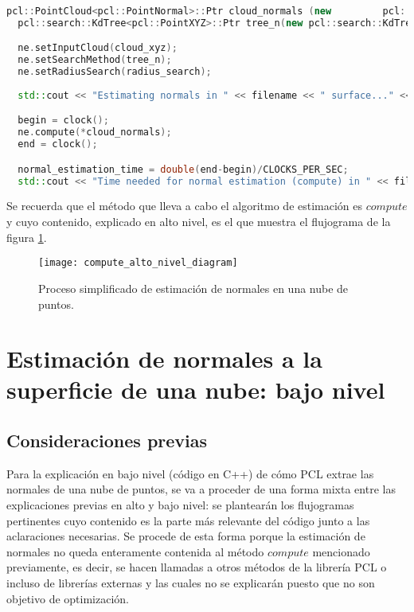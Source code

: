 \begin{lstlisting}[language=C++,breaklines]
  pcl::PointCloud<pcl::PointNormal>::Ptr cloud_normals (new 		pcl::PointCloud<pcl::PointNormal>);
  pcl::search::KdTree<pcl::PointXYZ>::Ptr tree_n(new pcl::search::KdTree<pcl::PointXYZ>());

  ne.setInputCloud(cloud_xyz);
  ne.setSearchMethod(tree_n);
  ne.setRadiusSearch(radius_search);
 
  std::cout << "Estimating normals in " << filename << " surface..." <<std::endl;

  begin = clock();
  ne.compute(*cloud_normals);
  end = clock();

  normal_estimation_time = double(end-begin)/CLOCKS_PER_SEC;
  std::cout << "Time needed for normal estimation (compute) in " << filename << ": " << normal_estimation_time << " seconds" << std::endl << std::endl;
\end{lstlisting}

Se recuerda que el método que lleva a cabo el algoritmo de estimación es $compute$ y cuyo contenido, explicado en alto nivel, es el que muestra el flujograma de la figura \ref{fig:compute_alto_nivel_diagram}.

\begin{figure}[!htb]
\centering
{}
  \texttt{[image: compute\_alto\_nivel\_diagram]}
  \caption{Proceso simplificado de estimación de normales en una nube de puntos.}\label{fig:compute_alto_nivel_diagram}
\endminipage\hfill

\end{figure}

\section{Estimación de normales a la superficie de una nube: bajo nivel}
\subsection{Consideraciones previas}
Para la explicación en bajo nivel (código en C++) de cómo PCL extrae las normales de una nube de puntos, se va a proceder de una forma mixta entre las explicaciones previas en alto y bajo nivel: se plantearán los flujogramas pertinentes cuyo contenido es la parte más relevante del código junto a las aclaraciones necesarias. Se procede de esta forma porque la estimación de normales no queda enteramente contenida al método $compute$ mencionado previamente, es decir, se hacen llamadas a otros métodos de la librería PCL o incluso de librerías externas y las cuales no se explicarán puesto que no son objetivo de optimización.

